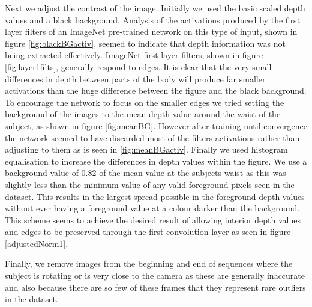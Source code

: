 \documentclass[11pt]{article} %
\begin{document}
Next we adjust the contrast of the image. Initially we used the basic scaled depth values and a black background. Analysis of the activations produced by the first layer filters of an ImageNet pre-trained network on this type of input, shown in figure \ref{fig:blackBGactiv}, seemed to indicate that depth information was not being extracted effectively. ImageNet first layer filters, shown in figure \ref{fig:layer1filts}, generally respond to edges. It is clear that the very small differences in depth between parts of the body will produce far smaller activations than the huge difference between the figure and the black background. To encourage the network to focus on the smaller edges we tried setting the background of the images to the mean depth value around the waist of the subject, as shown in figure \ref{fig:meanBG}. However after training until convergence the network seemed to have discarded most of the filters activations rather than adjusting to them as is seen in \ref{fig:meanBGactiv}. Finally we used histogram equalisation to increase the differences in depth values within the figure. We use a background value of 0.82 of the mean value at the subjects waist as this was slightly less than the minimum value of any valid foreground pixels seen in the dataset. This results in the largest spread possible in the foreground depth values without ever having a foreground value at a colour darker than the background. This scheme seems to achieve the desired result of allowing interior depth values and edges to be preserved through the first convolution layer as seen in figure \ref{adjustedNorm1}.

Finally, we remove images from the beginning and end of sequences where the subject is rotating or is very close to the camera as these are generally inaccurate and also because there are so few of these frames that they represent rare outliers in the dataset. 
\end{document}
